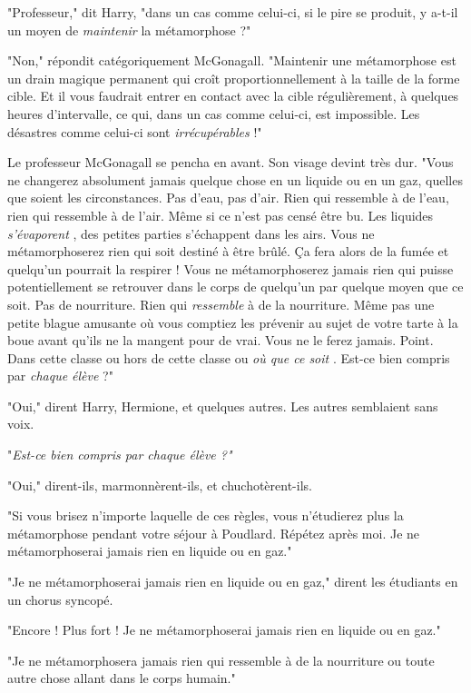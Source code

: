 "Professeur," dit Harry, "dans un cas comme celui-ci, si le pire se produit, y a-t-il un moyen de \emph{maintenir}  la métamorphose ?"

"Non," répondit catégoriquement McGonagall. "Maintenir une métamorphose est un drain magique permanent qui croît proportionnellement à la taille de la forme cible. Et il vous faudrait entrer en contact avec la cible régulièrement, à quelques heures d'intervalle, ce qui, dans un cas comme celui-ci, est impossible. Les désastres comme celui-ci sont \emph{irrécupérables}  !"

Le professeur McGonagall se pencha en avant. Son visage devint très dur. "Vous ne changerez absolument jamais quelque chose en un liquide ou en un gaz, quelles que soient les circonstances. Pas d'eau, pas d'air. Rien qui ressemble à de l'eau, rien qui ressemble à de l'air. Même si ce n'est pas censé être bu. Les liquides \emph{s'évaporent} , des petites parties s'échappent dans les airs. Vous ne métamorphoserez rien qui soit destiné à être brûlé. Ça fera alors de la fumée et quelqu'un pourrait la respirer ! Vous ne métamorphoserez jamais rien qui puisse potentiellement se retrouver dans le corps de quelqu'un par quelque moyen que ce soit. Pas de nourriture. Rien qui \emph{ressemble}  à de la nourriture. Même pas une petite blague amusante où vous comptiez les prévenir au sujet de votre tarte à la boue avant qu'ils ne la mangent pour de vrai. Vous ne le ferez jamais. Point. Dans cette classe ou hors de cette classe ou \emph{où que ce soit} . Est-ce bien compris par \emph{chaque élève}  ?"

"Oui," dirent Harry, Hermione, et quelques autres. Les autres semblaient sans voix.

"\emph{Est-ce bien compris par chaque élève ?"} 

"Oui," dirent-ils, marmonnèrent-ils, et chuchotèrent-ils.

"Si vous brisez n'importe laquelle de ces règles, vous n'étudierez plus la métamorphose pendant votre séjour à Poudlard. Répétez après moi. Je ne métamorphoserai jamais rien en liquide ou en gaz."

"Je ne métamorphoserai jamais rien en liquide ou en gaz," dirent les étudiants en un chorus syncopé.

"Encore ! Plus fort ! Je ne métamorphoserai jamais rien en liquide ou en gaz."

"Je ne métamorphosera jamais rien qui ressemble à de la nourriture ou toute autre chose allant dans le corps humain."

